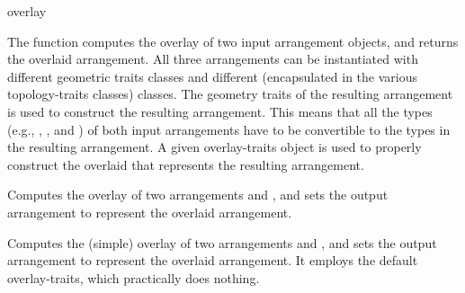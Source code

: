 \ccRefPageBegin

\begin{ccRefFunction}{overlay}

\ccDefinition

The function \ccRefName{} computes the overlay of two input arrangement
objects, and returns the overlaid arrangement. All three arrangements
can be instantiated with different geometric traits classes and different
\dcel{} (encapsulated in the various topology-traits classes) classes.
The geometry traits of the resulting arrangement is used to construct the
resulting arrangement. This means that all the types (e.g.,
, , and )
of both input arrangements have to be convertible to the types in the
resulting arrangement. A given overlay-traits object is used to properly
construct the overlaid \dcel{} that represents the resulting arrangement.



Computes the overlay of two arrangements  and , and sets
the output arrangement  to represent the overlaid arrangement.

Computes the (simple) overlay of two arrangements  and ,
and sets the output arrangement  to represent the overlaid
arrangement. It employs the default overlay-traits, which practically does
nothing.


\end{ccRefFunction}
